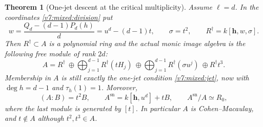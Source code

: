 \documentclass[10pt,fleqn]{article}
\numberwithin{equation}{section}
\newtheorem{theorem}{Theorem}[section]
\begin{document}
\begin{theorem}[One-jet descent at the critical multiplicity]
\label{v8:mixed:critical}
Assume $\ell=d$.  In the coordinates \eqref{v7:mixed:division} put
\[
 w=\frac{Q_d-(d-1)P_d(h)}d=u^d-(d-1)t,\qquad
 \sigma=t^2,\qquad R^\dagger=k[\mathbf h,w,\sigma].
\]
Then $R^\dagger\subset A$ is a polynomial ring and the actual monic
image algebra is the following free module of rank $2d$:
\begin{equation}\label{v8:mixed:critical-basis}
 A=R^\dagger\ \oplus\!\bigoplus_{j=1}^{d-1}R^\dagger(tH_j)
   \ \oplus\!\bigoplus_{j=1}^{d-1}R^\dagger(\sigma u^j)
   \ \oplus R^\dagger t^3.
\end{equation}
Membership in $A$ is still exactly the one-jet condition
\eqref{v7:mixed:jet}, now with $\deg h=d-1$ and $\tau_h(1)=1$.
Moreover,
\[
 (A:B)=t^2B,\qquad A^{\mathrm{sn}}=k[\mathbf h,u^d]+tB,
 \qquad A^{\mathrm{sn}}/A\simeq R_0,
\]
where the last module is generated by $[t]$.  In particular $A$ is
Cohen--Macaulay, and $t\notin A$ although $t^2,t^3\in A$.
\end{theorem}
\end{document}
